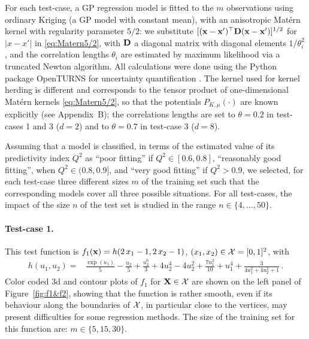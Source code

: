 For each test-case, a GP regression model is fitted to the $m$ observations using ordinary Kriging \cite{raswil06} (a GP model with constant mean), with an %
anisotropic Matérn kernel with regularity parameter $5/2$: we substitute $[({\bf x}-{\bf x}')^\top\mathbf{D}({\bf x}-{\bf x}')]^{1/2}$ for $|x-x'|$ in \eqref{eq:Matern5/2}, 
with $\mathbf{D}$ a diagonal matrix with diagonal elements $1/\theta_i^2$, and the correlation lengths $\theta_i$ are estimated by maximum likelihood via a truncated Newton algorithm. 
All calculations were done using the Python package OpenTURNS for uncertainty quantification \cite{baudut17}. The kernel used for kernel herding is different and corresponds to the tensor product of one-dimensional Matérn kernels \eqref{eq:Matern5/2}, so that the potentials $P_{K,\mu}(\cdot)$ are known explicitly (see Appendix~B); the correlations lengths are set to $\theta=0.2$ in test-cases 1 and 3 ($d=2$) and to $\theta=0.7$ in test-case 3 ($d=8$).

 
Assuming that a model is classified, in terms of the estimated value of its predictivity index $Q^2$ as ``poor fitting'' if $Q^2\in[0.6, 0.8]$, ``reasonably good fitting'', when $Q^2\in(0.8,0.9]$, and ``very good fitting'' if $Q^2>0.9$, we selected, for each test-case three different sizes $m$ of the training set such that the corresponding models cover all three possible situations. 
For all test-cases, the impact of the size $n$ of the test set is studied in the range $n\in\{4 ,\ldots,50\}$.

\paragraph{Test-case 1.}

This test function is $f_1({\bf x}) = h(2\,x_1 - 1, 2\,x_2 - 1)$, $(x_1,x_2) \in \mathcal{X}=[0,1]^2$, with
\begin{align*}
   h(u_1, u_2) =& \frac{\exp(u_1)}{5} - \frac{u_2}{5} + \frac{u_2^6}{3} + 4 u_2^4 - 4 u_2^2 + \frac{7u_1^2}{10} + u_1^4 + \frac{3}{4 u_1^2 + 4 u_2^2 + 1}\,.  %
\end{align*}
Color coded 3d and contour plots of $f_1$ for ${\bf X}\in\mathcal{X}$ are shown on the left panel of Figure~\ref{fig:f1&f2}, showing that 
the function is rather smooth, even if its behaviour along the boundaries of $\mathcal{X}$, in particular close to the vertices, may present difficulties for some regression methods. The size of the training set for this function are: $m\in\{5, 15, 30\}$.

